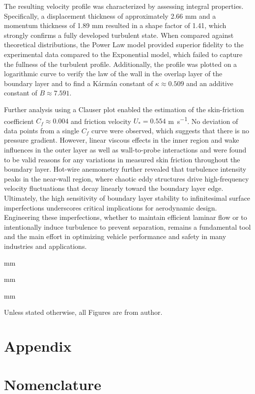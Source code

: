 \documentclass{article}
\newcommand{\newpara}
    {
    \vskip 1 mm
    \noindent
    }
\begin{document}
The resulting velocity profile was characterized by assessing integral properties. Specifically, a displacement thickness of approximately 2.66 \si{\mm} and a momentum thickness of 1.89 \si{\mm} resulted in a shape factor of 1.41, which strongly confirms a fully developed turbulent state. When compared against theoretical distributions, the Power Law model provided superior fidelity to the experimental data compared to the Exponential model, which failed to capture the fullness of the turbulent profile. Additionally, the profile was plotted on a logarithmic curve to verify the law of the wall in the overlap layer of the boundary layer and to find a K\'arm\'an constant of $\kappa \approx 0.509$ and an additive constant of $B \approx 7.591$.

Further analysis using a Clauser plot enabled the estimation of the skin-friction coefficient $C_f \approx 0.004$ and friction velocity $U_* = 0.554$ \si{\metre \per \second}. No deviation of data points from a single $C_f$ curve were observed, which suggests that there is no pressure gradient. However, linear viscous effects in the inner region and wake influences in the outer layer as well as wall-to-probe interactions and were found to be valid reasons for any variations in measured skin friction throughout the boundary layer. Hot-wire anemometry further revealed that turbulence intensity peaks in the near-wall region, where chaotic eddy structures drive high-frequency velocity fluctuations that decay linearly toward the boundary layer edge. Ultimately, the high sensitivity of boundary layer stability to infinitesimal surface imperfections underscores critical implications for aerodynamic design. Engineering these imperfections, whether to maintain efficient laminar flow or to intentionally induce turbulence to prevent separation, remains a fundamental tool and the main effort in optimizing vehicle performance and safety in many industries and applications.

\newpage


\newpara
\newpara
\newpara
Unless stated otherwise, all Figures are from author.

\section{Appendix}
\appendix

\section{Nomenclature}
\label{app:symbols}
\end{document}
